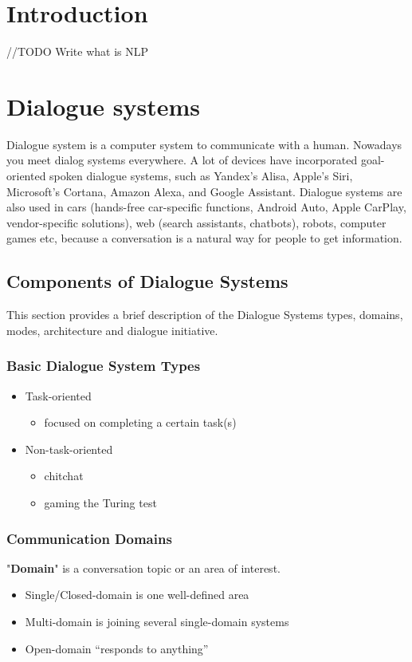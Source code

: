 \chapter{Introduction}\label{introduction}
//TODO Write what is NLP

\chapter{Dialogue systems}\label{dialogue systems}
Dialogue system is a computer system to communicate with a human. Nowadays you meet dialog systems everywhere. A lot of devices have incorporated goal-oriented spoken dialogue systems, such as  Yandex’s Alisa,  Apple’s Siri, Microsoft’s Cortana, Amazon Alexa, and Google Assistant. Dialogue systems are also used in cars (hands-free car-specific functions, Android Auto, Apple CarPlay, vendor-specific solutions), web (search assistants, chatbots), robots, computer games etc, because a conversation is a natural way for people to get information.

\section{Components of Dialogue Systems}
This section provides a brief description of the Dialogue Systems types, domains, modes, architecture and dialogue initiative.
\subsection{Basic Dialogue System Types}
\begin{itemize}
  \item Task-oriented 
    \begin{itemize}
      \item focused on completing a certain task(s)
    \end{itemize}
  \item Non-task-oriented
    \begin{itemize}
      \item chitchat
      \item gaming the Turing test
    \end{itemize}    
\end{itemize}

\subsection{Communication Domains}
"\textbf{Domain}" is a conversation topic or an area of interest.
\begin{itemize}
  \item Single/Closed-domain is one well-defined area
  \item Multi-domain is joining several single-domain systems
  \item Open-domain “responds to anything”
\end{itemize}


